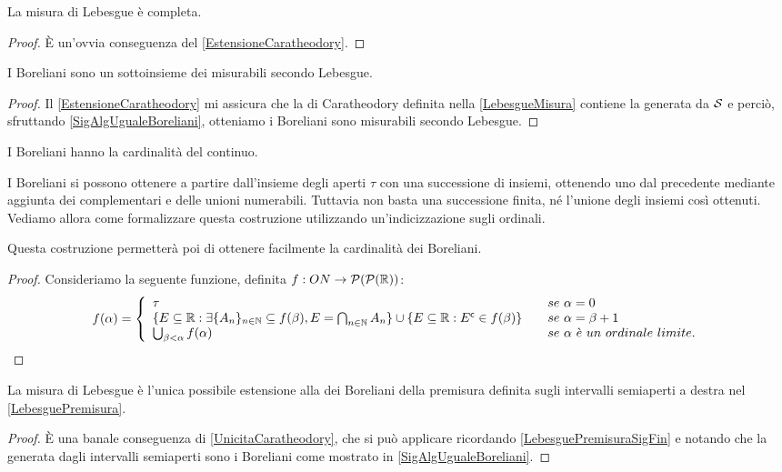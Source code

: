 \begin{remark}\label{LebesgueCompletezza}
	La misura di Lebesgue è completa.
\end{remark}
\begin{proof}
	È un'ovvia conseguenza del \cref{EstensioneCaratheodory}.
\end{proof}

\begin{proposition}
	I Boreliani sono un sottoinsieme dei misurabili secondo Lebesgue.
\end{proposition}
\begin{proof}
	Il \cref{EstensioneCaratheodory} mi assicura che la \sigalg{} di Caratheodory definita nella \cref{LebesgueMisura} contiene la \sigalg{} generata da $\S$ e perciò, sfruttando \cref{SigAlgUgualeBoreliani}, otteniamo i Boreliani sono misurabili secondo Lebesgue.
\end{proof}

\begin{proposition}\label{CardBoreliani}
	I Boreliani hanno la cardinalità del continuo.
\end{proposition}
\begin{remark}
	I Boreliani si possono ottenere a partire dall'insieme degli aperti $\tau$ con una successione di insiemi, ottenendo uno dal precedente
	mediante aggiunta dei complementari e delle unioni numerabili. Tuttavia non basta una successione finita, né l'unione degli insiemi
	così ottenuti. Vediamo allora come formalizzare questa costruzione utilizzando un'indicizzazione sugli ordinali.
	
	Questa costruzione permetterà poi di ottenere facilmente la cardinalità dei Boreliani.
\end{remark}
\begin{proof}
	Consideriamo la seguente funzione, definita $f:ON \rightarrow \mathcal{P}(\mathcal{P}(\R))$:
	\[
	f(\alpha) = \left\{
		\begin{array}{ll}
			\tau & \quad se\ \alpha=0 \\
			\{ E\subseteq \R : \exists \{A_n\}_{n\in \N}\subseteq f(\beta), E = \bigcap_{n\in\N}A_n\}
			\cup\{E\subseteq\R : E^\mathsf{c}\in f(\beta)\} & \quad se\ \alpha=\beta+1\\
			\bigcup_{\beta < \alpha}f(\alpha) & \quad se\ \alpha\ \grave{e}\ un\ ordinale\ limite.
		\end{array}
	\right.
	\]

\end{proof}


\begin{proposition}
	La misura di Lebesgue è l'unica possibile estensione alla \sigalg{} dei Boreliani della premisura definita sugli intervalli semiaperti a destra nel \cref{LebesguePremisura}.
\end{proposition}
\begin{proof}
	È una banale conseguenza di \cref{UnicitaCaratheodory}, che si può applicare ricordando \cref{LebesguePremisuraSigFin} e notando che la \sigalg{} generata dagli intervalli semiaperti sono i Boreliani come mostrato in \cref{SigAlgUgualeBoreliani}.
\end{proof}

